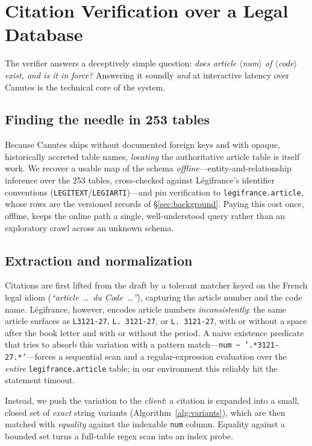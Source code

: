 \section{Citation Verification over a Legal Database}
\label{sec:verify}

The verifier answers a deceptively simple question: \emph{does article
$\langle$num$\rangle$ of $\langle$code$\rangle$ exist, and is it in force?}
Answering it soundly \emph{and} at interactive latency over Canutes is the
technical core of the system.

\subsection{Finding the needle in 253 tables}
Because Canutes ships without documented foreign keys and with opaque,
historically accreted table names, \emph{locating} the authoritative article
table is itself work. We recover a usable map of the schema
\emph{offline}---entity-and-relationship inference over the 253 tables,
cross-checked against L\'egifrance's identifier conventions
(\texttt{LEGITEXT}/\texttt{LEGIARTI})---and pin verification to
\texttt{legifrance.article}, whose rows are the versioned records of
\S\ref{sec:background}. Paying this cost once, offline, keeps the online path a
single, well-understood query rather than an exploratory crawl across an
unknown schema.

\subsection{Extraction and normalization}
Citations are first lifted from the draft by a tolerant matcher keyed on the
French legal idiom (\emph{``article~\ldots\ du Code~\ldots''}), capturing the
article number and the code name. L\'egifrance, however, encodes article
numbers \emph{inconsistently}: the same article surfaces as \texttt{L3121-27},
\texttt{L.\,3121-27}, or \texttt{L. 3121-27}, with or without a space after the
book letter and with or without the period. A naive existence predicate that
tries to absorb this variation with a pattern
match---\texttt{num \textasciitilde{} '.*3121-27.*'}---forces a sequential scan
and a regular-expression evaluation over the \emph{entire}
\texttt{legifrance.article} table; in our environment this reliably hit the
statement timeout.

Instead, we push the variation to the \emph{client}: a citation is expanded
into a small, closed set of \emph{exact} string variants
(Algorithm~\ref{alg:variants}), which are then matched with \emph{equality}
against the indexable \texttt{num} column. Equality against a bounded set turns
a full-table regex scan into an index probe.

